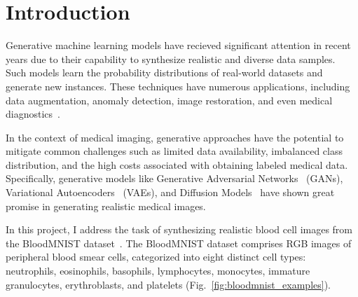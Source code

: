 \section{Introduction}

Generative machine learning models have recieved significant attention in recent years due to their capability to synthesize realistic and diverse data samples. Such models learn the probability distributions of real-world datasets and generate new instances. These techniques have numerous applications, including data augmentation, anomaly detection, image restoration, and even medical diagnostics~\cite{yi2019generative}.

In the context of medical imaging, generative approaches have the potential to mitigate common challenges such as limited data availability, imbalanced class distribution, and the high costs associated with obtaining labeled medical data. Specifically, generative models like Generative Adversarial Networks~\cite{goodfellow2014generative} (GANs), Variational Autoencoders~\cite{kingma2013auto} (VAEs), and Diffusion Models~\cite{ho2020denoising} have shown great promise in generating realistic medical images.

In this project, I address the task of synthesizing realistic blood cell images from the BloodMNIST dataset~\cite{medmnistv2}. The BloodMNIST dataset comprises RGB images of peripheral blood smear cells, categorized into eight distinct cell types: neutrophils, eosinophils, basophils, lymphocytes, monocytes, immature granulocytes, erythroblasts, and platelets (Fig.~\ref{fig:bloodmnist_examples}).

